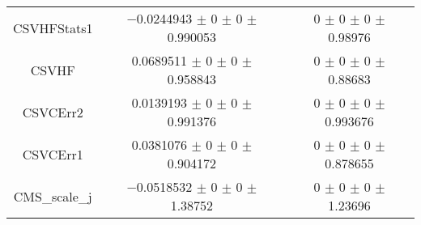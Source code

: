 \begin{table}
\begin{tabular}{ccc}
CSVHFStats1 & \num{-0.0244943} $\pm$ \num{0} $\pm$ \num{0} $\pm$ \num{0.990053} & \num{0} $\pm$ \num{0} $\pm$ \num{0} $\pm$ \num{0.98976}\\
CSVHF & \num{0.0689511} $\pm$ \num{0} $\pm$ \num{0} $\pm$ \num{0.958843} & \num{0} $\pm$ \num{0} $\pm$ \num{0} $\pm$ \num{0.88683}\\
CSVCErr2 & \num{0.0139193} $\pm$ \num{0} $\pm$ \num{0} $\pm$ \num{0.991376} & \num{0} $\pm$ \num{0} $\pm$ \num{0} $\pm$ \num{0.993676}\\
CSVCErr1 & \num{0.0381076} $\pm$ \num{0} $\pm$ \num{0} $\pm$ \num{0.904172} & \num{0} $\pm$ \num{0} $\pm$ \num{0} $\pm$ \num{0.878655}\\
CMS\_scale\_j & \num{-0.0518532} $\pm$ \num{0} $\pm$ \num{0} $\pm$ \num{1.38752} & \num{0} $\pm$ \num{0} $\pm$ \num{0} $\pm$ \num{1.23696}\\
\bottomrule
\end{tabular}
\end{table}